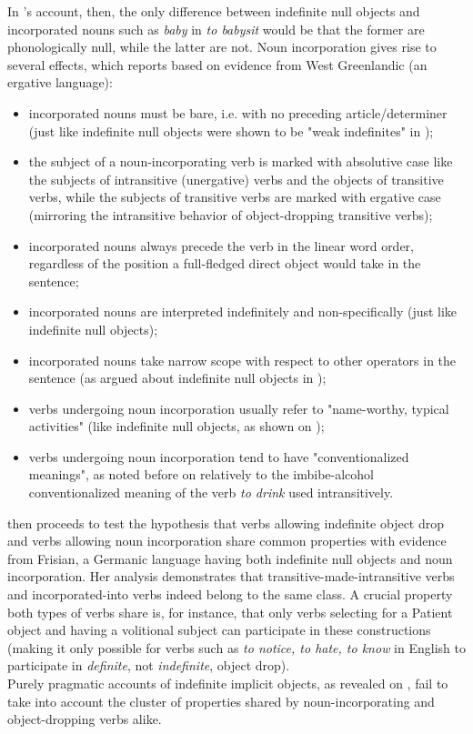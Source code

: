 In \textcite{Marti2015}'s account, then, the only difference between indefinite null objects and incorporated nouns such as \textit{baby} in \textit{to babysit} would be that the former are phonologically null, while the latter are not. Noun incorporation gives rise to several effects, which \textcite[455-456]{Marti2015} reports based on evidence from West Greenlandic (an ergative language):
\begin{itemize}
    \item incorporated nouns must be bare, i.e. with no preceding article/determiner (just like indefinite null objects were shown to be "weak indefinites" in );
    \item the subject of a noun-incorporating verb is marked with absolutive case like the subjects of intransitive (unergative) verbs and the objects of transitive verbs, while the subjects of transitive verbs are marked with ergative case (mirroring the intransitive behavior of object-dropping transitive verbs);
    \item incorporated nouns always precede the verb in the linear word order, regardless of the position a full-fledged direct object would take in the sentence;
    \item incorporated nouns are interpreted indefinitely and non-specifically (just like indefinite null objects);
    \item incorporated nouns take narrow scope with respect to other operators in the sentence (as argued about indefinite null objects in );
    \item verbs undergoing noun incorporation usually refer to "name-worthy, typical activities" (like indefinite null objects, as shown on );
    \item verbs undergoing noun incorporation tend to have "conventionalized meanings", as noted before on  relatively to the imbibe-alcohol conventionalized meaning of the verb \textit{to drink} used intransitively.
\end{itemize}

\textcite[461-463]{Marti2015} then proceeds to test the hypothesis that verbs allowing indefinite object drop and verbs allowing noun incorporation share common properties with evidence from Frisian, a Germanic language having both indefinite null objects and noun incorporation. Her analysis demonstrates that transitive-made-intransitive verbs and incorporated-into verbs indeed belong to the same class. A crucial property both types of verbs share is, for instance, that only verbs selecting for a Patient object and having a volitional subject can participate in these constructions (making it only possible for verbs such as \textit{to notice, to hate, to know} in English to participate in \textit{definite}, not \textit{indefinite}, object drop).\\
Purely pragmatic accounts of indefinite implicit objects, as revealed on , fail to take into account the cluster of properties shared by noun-incorporating and object-dropping verbs alike. 


